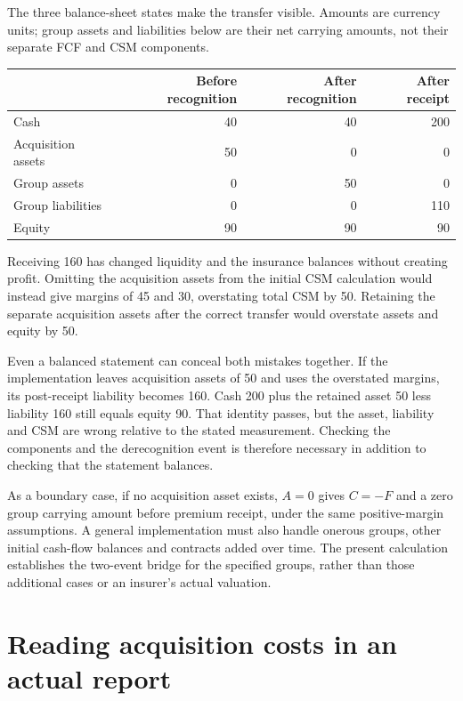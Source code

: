 \clearpage
The three balance-sheet states make the transfer visible. Amounts are
currency units; group assets and liabilities below are their net carrying
amounts, not their separate FCF and CSM components.
\begin{center}
\begin{tabular}{lrrr}
\toprule
 & Before recognition & After recognition & After receipt \\
\midrule
Cash & 40 & 40 & 200 \\
Acquisition assets & 50 & 0 & 0 \\
Group assets & 0 & 50 & 0 \\
Group liabilities & 0 & 0 & 110 \\
Equity & 90 & 90 & 90 \\
\bottomrule
\end{tabular}
\end{center}
Receiving 160 has changed liquidity and the insurance balances without
creating profit. Omitting the acquisition assets from the initial CSM
calculation would instead give margins of 45 and 30, overstating total CSM
by 50. Retaining the separate acquisition assets after the correct transfer
would overstate assets and equity by 50.

Even a balanced statement can conceal both mistakes together. If the
implementation leaves acquisition assets of 50 and uses the overstated
margins, its post-receipt liability becomes 160. Cash 200 plus the retained
asset 50 less liability 160 still equals equity 90. That identity passes,
but the asset, liability and CSM are wrong relative to the stated measurement.
Checking the components and the derecognition event is therefore necessary
in addition to checking that the statement balances.

As a boundary case, if no acquisition asset exists, $A=0$ gives $C=-F$ and
a zero group carrying amount before premium receipt, under the same
positive-margin assumptions. A general implementation must also handle
onerous groups, other initial cash-flow balances and contracts added over
time. The present calculation establishes the two-event bridge for the
specified groups, rather than those additional cases or an insurer's actual
valuation.

\clearpage


\section{Reading acquisition costs in an actual report}
\label{sec:munich-new-contracts}

